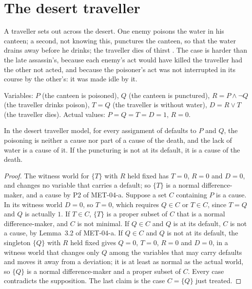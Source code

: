 \documentclass{situationist-preprint}
\begin{document}
\section{The desert traveller}

A traveller sets out across the desert. One enemy poisons the water in his canteen; a second, not knowing this, punctures the canteen, so that the water drains away before he drinks; the traveller dies of thirst \citep{McLaughlin1925,HartHonore1985}. The case is harder than the late assassin's, because each enemy's act would have killed the traveller had the other not acted, and because the poisoner's act was not interrupted in its course by the other's: it was made idle by it.

Variables: $P$ (the canteen is poisoned), $Q$ (the canteen is punctured), $R = P \wedge \neg Q$ (the traveller drinks poison), $T = Q$ (the traveller is without water), $D = R \vee T$ (the traveller dies). Actual values: $P = Q = T = D = 1$, $R = 0$.

\begin{proposition}\label{p:desert}
In the desert traveller model, for every assignment of defaults to $P$ and $Q$, the poisoning is neither a cause nor part of a cause of the death, and the lack of water is a cause of it. If the puncturing is not at its default, it is a cause of the death.
\end{proposition}

\begin{proof}
The witness world for $\{T\}$ with $R$ held fixed has $T = 0$, $R = 0$ and $D = 0$, and changes no variable that carries a default; so $\{T\}$ is a normal difference-maker, and a cause by P2 of MET-04-a. Suppose a set $C$ containing $P$ is a cause. In its witness world $D = 0$, so $T = 0$, which requires $Q \in C$ or $T \in C$, since $T = Q$ and $Q$ is actually $1$. If $T \in C$, $\{T\}$ is a proper subset of $C$ that is a normal difference-maker, and $C$ is not minimal. If $Q \in C$ and $Q$ is at its default, $C$ is not a cause, by Lemma~3.2 of MET-04-a. If $Q \in C$ and $Q$ is not at its default, the singleton $\{Q\}$ with $R$ held fixed gives $Q = 0$, $T = 0$, $R = 0$ and $D = 0$, in a witness world that changes only $Q$ among the variables that may carry defaults and moves it away from a deviation; it is at least as normal as the actual world, so $\{Q\}$ is a normal difference-maker and a proper subset of $C$. Every case contradicts the supposition. The last claim is the case $C = \{Q\}$ just treated.
\end{proof}
\end{document}
